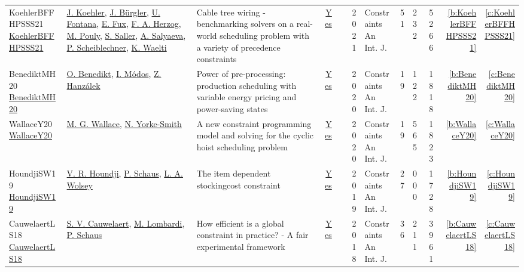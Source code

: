 {\begin{longtable}{>{\raggedright\arraybackslash}p{3cm}>{\raggedright\arraybackslash}p{4.5cm}>{\raggedright\arraybackslash}p{6.0cm}rrrp{2.5cm}rp{1cm}p{1cm}rr}
KoehlerBFFHPSSS21 \href{https://doi.org/10.1007/s10601-021-09321-w}{KoehlerBFFHPSSS21} & \hyperref[auth:a104]{J. Koehler}, \hyperref[auth:a105]{J. B{\"{u}}rgler}, \hyperref[auth:a106]{U. Fontana}, \hyperref[auth:a107]{E. Fux}, \hyperref[auth:a108]{F. A. Herzog}, \hyperref[auth:a109]{M. Pouly}, \hyperref[auth:a110]{S. Saller}, \hyperref[auth:a111]{A. Salyaeva}, \hyperref[auth:a112]{P. Scheiblechner}, \hyperref[auth:a113]{K. Waelti} & \cellcolor{gold!20}Cable tree wiring - benchmarking solvers on a real-world scheduling problem with a variety of precedence constraints & \href{../works/KoehlerBFFHPSSS21.pdf}{Yes} & \cite{KoehlerBFFHPSSS21} & 2021 & Constraints An Int. J. & 51 & 2 3 2 & 52 66 & \ref{b:KoehlerBFFHPSSS21} & \ref{c:KoehlerBFFHPSSS21}\\
BenediktMH20 \href{https://doi.org/10.1007/s10601-020-09317-y}{BenediktMH20} & \hyperref[auth:a114]{O. Benedikt}, \hyperref[auth:a115]{I. M{\'{o}}dos}, \hyperref[auth:a116]{Z. Hanz{\'{a}}lek} & \cellcolor{green!10}Power of pre-processing: production scheduling with variable energy pricing and power-saving states & \href{../works/BenediktMH20.pdf}{Yes} & \cite{BenediktMH20} & 2020 & Constraints An Int. J. & 19 & 1 2 2 & 18 18 & \ref{b:BenediktMH20} & \ref{c:BenediktMH20}\\
WallaceY20 \href{https://doi.org/10.1007/s10601-020-09316-z}{WallaceY20} & \hyperref[auth:a117]{M. G. Wallace}, \hyperref[auth:a19]{N. Yorke-Smith} & \cellcolor{gold!20}A new constraint programming model and solving for the cyclic hoist scheduling problem & \href{../works/WallaceY20.pdf}{Yes} & \cite{WallaceY20} & 2020 & Constraints An Int. J. & 19 & 5 6 5 & 18 23 & \ref{b:WallaceY20} & \ref{c:WallaceY20}\\
HoundjiSW19 \href{https://doi.org/10.1007/s10601-018-9300-y}{HoundjiSW19} & \hyperref[auth:a223]{V. R. Houndji}, \hyperref[auth:a147]{P. Schaus}, \hyperref[auth:a224]{L. A. Wolsey} & The item dependent stockingcost constraint & \href{../works/HoundjiSW19.pdf}{Yes} & \cite{HoundjiSW19} & 2019 & Constraints An Int. J. & 27 & 0 0 0 & 17 28 & \ref{b:HoundjiSW19} & \ref{c:HoundjiSW19}\\
CauwelaertLS18 \href{https://doi.org/10.1007/s10601-017-9277-y}{CauwelaertLS18} & \hyperref[auth:a201]{S. V. Cauwelaert}, \hyperref[auth:a142]{M. Lombardi}, \hyperref[auth:a147]{P. Schaus} & How efficient is a global constraint in practice? - {A} fair experimental framework & \href{../works/CauwelaertLS18.pdf}{Yes} & \cite{CauwelaertLS18} & 2018 & Constraints An Int. J. & 36 & 2 1 1 & 39 61 & \ref{b:CauwelaertLS18} & \ref{c:CauwelaertLS18}\\

\end{longtable}}
